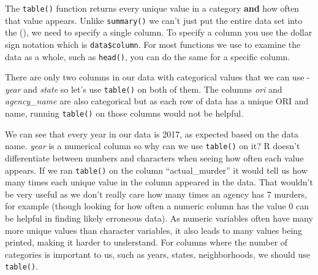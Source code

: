 \documentclass[
]{krantz}
\makeatletter
\newenvironment{Shaded}{\begin{snugshade}}{\end{snugshade}}
\newcommand{\CommentTok}[1]{\textcolor[rgb]{0.37,0.37,0.37}{\textit{#1}}}
\newcommand{\FunctionTok}[1]{\textcolor[rgb]{0,0,0}{#1}}
\newcommand{\NormalTok}[1]{#1}
\newcommand{\SpecialCharTok}[1]{\textcolor[rgb]{0,0,0}{#1}}
\newenvironment{kframe}{%
\medskip{}
\setlength{\fboxsep}{.8em}
 \def\at@end@of@kframe{}%
 \ifinner\ifhmode%
  \def\at@end@of@kframe{\end{minipage}}%
  \begin{minipage}{\columnwidth}%
 \fi\fi%
 \def\FrameCommand##1{\hskip\@totalleftmargin \hskip-\fboxsep
 \colorbox{shadecolor}{##1}\hskip-\fboxsep
     \hskip-\linewidth \hskip-\@totalleftmargin \hskip\columnwidth}%
 \MakeFramed {\advance\hsize-\width
   \@totalleftmargin\z@ \linewidth\hsize
   \@setminipage}}%
 {\par\unskip\endMakeFramed%
 \at@end@of@kframe}
\renewenvironment{Shaded}{\begin{kframe}}{\end{kframe}}
\makeatother
\begin{document}
The \texttt{table()} function returns every unique value in a category \textbf{and} how often that value appears. Unlike \texttt{summary()} we can't just put the entire data set into the (), we need to specify a single column. To specify a column you use the dollar sign notation which is \texttt{data\$column}. For most functions we use to examine the data as a whole, such as \texttt{head()}, you can do the same for a specific column.

\begin{Shaded}
\end{Shaded}

There are only two columns in our data with categorical values that we can use - \emph{year} and \emph{state} so let's use \texttt{table()} on both of them. The columns \emph{ori} and \emph{agency\_name} are also categorical but as each row of data has a unique ORI and name, running \texttt{table()} on those columns would not be helpful.

\begin{Shaded}
\end{Shaded}

We can see that every year in our data is 2017, as expected based on the data name. \emph{year} is a numerical column so why can we use \texttt{table()} on it? R doesn't differentiate between numbers and characters when seeing how often each value appears. If we ran \texttt{table()} on the column ``actual\_murder'' it would tell us how many times each unique value in the column appeared in the data. That wouldn't be very useful as we don't really care how many times an agency has 7 murders, for example (though looking for how often a numeric column has the value 0 can be helpful in finding likely erroneous data). As numeric variables often have many more unique values than character variables, it also leads to many values being printed, making it harder to understand. For columns where the number of categories is important to us, such as years, states, neighborhoods, we should use \texttt{table()}.
\end{document}
